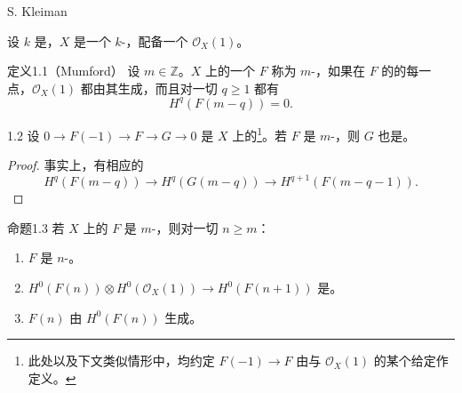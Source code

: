 \begin{center}S. Kleiman\end{center}
设 $k$ 是，$X$ 是一个 $k$-，配备一个 $\mathcal O_X(1)$。
\begin{SGAresult}{定义}{1.1（Mumford）}
设 $m\in\mathbb Z$。$X$ 上的一个 $F$ 称为 $m$-，如果在 $F$ 的的每一点，$\mathcal O_X(1)$ 都由其生成，而且对一切 $q\geq1$ 都有
\[H^q(F(m-q))=0.\]
\end{SGAresult}
\begin{SGAresult}{}{1.2}
设 $0\to F(-1)\to F\to G\to0$ 是 $X$ 上的\footnote{此处以及下文类似情形中，均约定 $F(-1)\to F$ 由与 $\mathcal O_X(1)$ 的某个给定作定义。}。若 $F$ 是 $m$-，则 $G$ 也是。
\end{SGAresult}
\begin{proof}
事实上，有相应的
\[H^q(F(m-q))\longrightarrow H^q(G(m-q))\longrightarrow H^{q+1}(F(m-q-1)).\]
\end{proof}
\begin{SGAresult}{命题}{1.3}
若 $X$ 上的 $F$ 是 $m$-，则对一切 $n\geq m$：
\begin{enumerate}
\item[(i)] $F$ 是 $n$-。
\item[(ii)] $H^0(F(n))\otimes H^0(\mathcal O_X(1))\to H^0(F(n+1))$ 是。
\item[(iii)] $F(n)$ 由 $H^0(F(n))$ 生成。
\end{enumerate}
\end{SGAresult}
